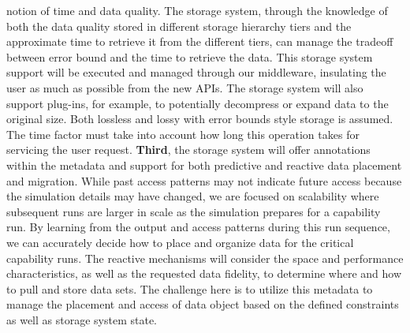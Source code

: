 \documentclass[11pt,letterpaper]{article}
\begin{document}
notion of time and data quality. The storage system,
through the knowledge of both the data quality stored in different storage
hierarchy tiers and the approximate time to retrieve it from the different
tiers, can manage the tradeoff between error bound and the time to
retrieve the data. This storage system support will be executed and managed through our middleware, 
insulating the user as much as possible from the new APIs. The storage system
will also support plug-ins, for example, to potentially decompress or expand data to the
original size. Both lossless and lossy with error bounds style storage is
assumed. The time factor must take into account how long this operation takes
for servicing the user request. 
%
\textbf{Third}, the storage system will offer annotations within the metadata
and support for both predictive and reactive data placement and migration.
While past access patterns may not indicate future access because the
simulation details may have changed, we are focused on scalability where
subsequent runs are larger in scale as the simulation prepares for a capability run.  By
learning from the output and access patterns during this run sequence, we can
accurately decide how to place and organize data for the critical capability
runs. The reactive mechanisms will consider the space and performance
characteristics, as well as the requested data fidelity, to determine where and
how to pull and store data sets. The challenge here is to utilize this
metadata to manage the placement and access of data object based on the
defined constraints as well as storage system state. 
\end{document}
